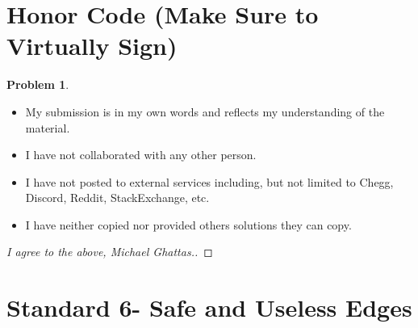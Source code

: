\documentclass[11pt]{article}
\theoremstyle{definition}
\theoremstyle{definition}
\newtheorem{required}{Problem}
\theoremstyle{definition}
\begin{document}
\section{Honor Code (Make Sure to Virtually Sign)} \label{HonorCode}

\begin{required}
\noindent 
\begin{itemize}
\item My submission is in my own words and reflects my understanding of the material.
\item I have not collaborated with any other person.
\item I have not posted to external services including, but not limited to Chegg, Discord, Reddit, StackExchange, etc.
\item I have neither copied nor provided others solutions they can copy.
\end{itemize}

\end{required}

\begin{proof}[I agree to the above, Michael Ghattas.]
\end{proof}


\newpage
\section{Standard 6- Safe and Useless Edges}
\end{document}
